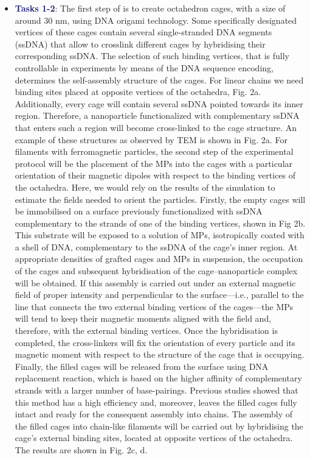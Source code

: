 \documentclass{article}
\begin{document}
\begin{itemize}
    \item{\textbf{\textcolor{MidnightBlue}{Tasks 1-2}}: The first step of is to create octahedron cages, with a size of around 30 nm, using DNA origami technology.\cite{tian2015prescribed} Some specifically designated vertices of these cages contain several single-stranded DNA segments (ssDNA) that allow to crosslink different cages by hybridising their corresponding ssDNA. The selection of such binding vertices, that is fully controllable in experiments by means of the DNA sequence encoding,\cite{tian2015prescribed} determines the self-assembly structure of the cages. For linear chains we need binding sites placed at opposite vertices of the octahedra, Fig. 2a. Additionally, every cage will contain several ssDNA pointed towards its inner region. Therefore, a nanoparticle functionalized with complementary ssDNA that enters such a region will become cross-linked to the cage structure.\cite{sun2013dna,zhang2013general} An example of these structures as observed by TEM is shown in Fig. 2a. For filaments with ferromagnetic particles, the second step of the experimental protocol will be the placement of the MPs into the cages with a particular orientation of their magnetic dipoles with respect to the binding vertices of the octahedra. Here, we would rely on the results of the simulation to estimate the fields needed to orient the particles. Firstly, the empty cages will be immobilised on a surface previously functionalized with ssDNA complementary to the strands of one of the binding vertices,\cite{maye2009stepwise} shown in Fig 2b. This substrate will be exposed to a solution of MPs, isotropically coated with a shell of DNA, complementary to the ssDNA of the cage’s inner region. At appropriate densities of grafted cages and MPs in suspension, the occupation of the cages and subsequent hybridisation of the cage–nanoparticle complex will be obtained. If this assembly is carried out under an external magnetic field of proper intensity and perpendicular to the surface—i.e., parallel to the line that connects the two external binding vertices of the cages—the MPs will tend to keep their magnetic moments aligned with the field and, therefore, with the external binding vertices. Once the hybridisation is completed, the cross-linkers will fix the orientation of every particle and its magnetic moment with respect to the structure of the cage that is occupying. Finally, the filled cages will be released from the surface using DNA replacement reaction, which is based on the higher affinity of complementary strands with a larger number of base-pairings. Previous studies showed that this method has a high efficiency and, moreover, leaves the filled cages fully intact and ready for the consequent assembly into chains.\cite{sun2013dna,Sun_2013} The assembly of the filled cages into chain-like filaments will be carried out by hybridising the cage’s external binding sites, located at opposite vertices of the octahedra.\cite{tian2015prescribed} The results are shown in Fig. 2c, d.}

\end{itemize}
\end{document}
